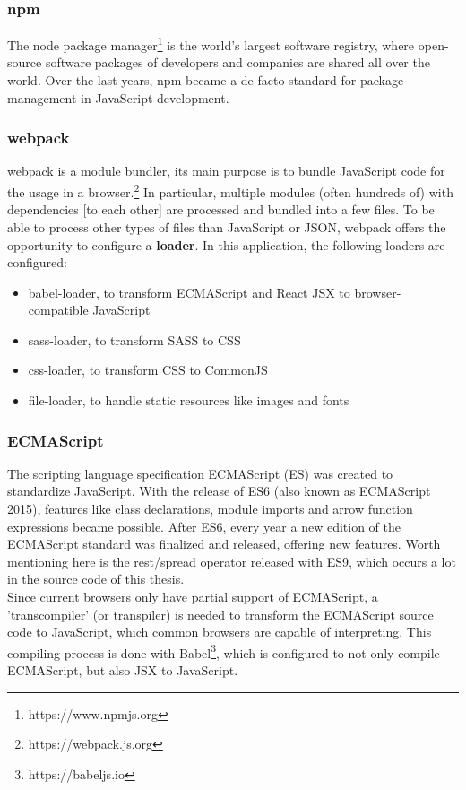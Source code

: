 \documentclass[a4paper,11pt,pdftex,halfparskip,cleardoubleempty,bibtotoc,liststotoc]{scrbook}
\begin{document}
\subsubsection{npm}

The node package manager\footnote{https://www.npmjs.org} is the world's largest software registry, where open-source software packages of developers and companies are shared all over the world. Over the last years, npm became a de-facto standard for package management in JavaScript development.

\subsubsection{webpack}

webpack is a module bundler, its main purpose is to bundle JavaScript code for the usage in a browser.\footnote{https://webpack.js.org} In particular, multiple modules (often hundreds of) with dependencies [to each other] are processed and bundled into a few files. To be able to process other types of files than JavaScript or JSON, webpack offers the opportunity to configure a \textbf{loader}. In this application, the following loaders are configured:
\begin{itemize}
\item babel-loader, to transform ECMAScript and React JSX to browser-compatible JavaScript
\item sass-loader, to transform SASS to CSS
\item css-loader, to transform CSS to CommonJS
\item file-loader, to handle static resources like images and fonts
\end{itemize}

\subsubsection{ECMAScript}

The scripting language specification ECMAScript (ES) was created to standardize JavaScript. With the release of ES6 (also known as ECMAScript 2015), features like class declarations, module imports and arrow function expressions became possible. After ES6, every year a new edition of the ECMAScript standard was finalized and released, offering new features. Worth mentioning here is the rest/spread operator released with ES9, which occurs a lot in the source code of this thesis.\\
Since current browsers only have partial support of ECMAScript, a 'transcompiler' (or transpiler) is needed to transform the ECMAScript source code to JavaScript, which common browsers are capable of interpreting.
This compiling process is done with Babel\footnote{https://babeljs.io}, which is configured to not only compile ECMAScript, but also JSX to JavaScript.
\end{document}
